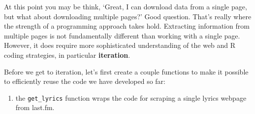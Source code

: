 \documentclass[
]{article}
\providecommand{\tightlist}{%
  \setlength{\itemsep}{0pt}\setlength{\parskip}{0pt}}
\begin{document}
At this point you may be think, `Great, I can download data from a single page, but what about downloading multiple pages?' Good question. That's really where the strength of a programming approach takes hold. Extracting information from multiple pages is not fundamentally different than working with a single page. However, it does require more sophisticated understanding of the web and R coding strategies, in particular \textbf{iteration}.

Before we get to iteration, let's first create a couple functions to make it possible to efficiently reuse the code we have developed so far:

\begin{enumerate}
\def\labelenumi{\arabic{enumi}.}
\tightlist
\item
  the \texttt{get\_lyrics} function wraps the code for scraping a single lyrics webpage from last.fm.
\end{enumerate}
\end{document}
